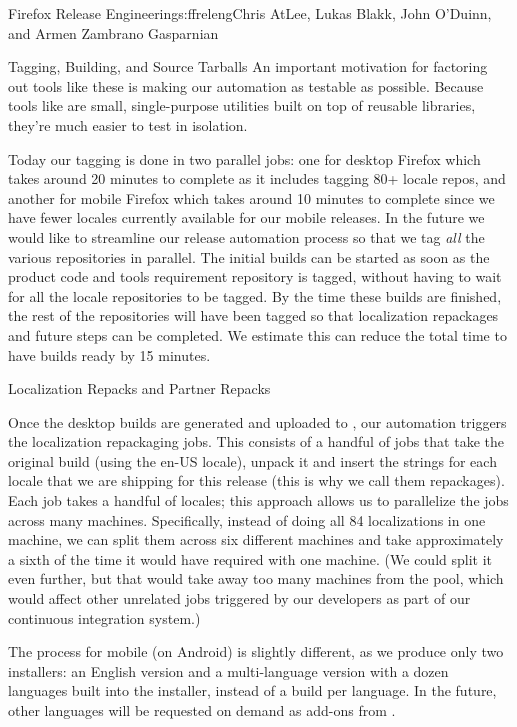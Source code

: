 \begin{aosachapter}{Firefox Release Engineering}{s:ffreleng}{Chris AtLee, Lukas Blakk, John O'Duinn, and Armen Zambrano Gasparnian}
\begin{aosasect1}{Tagging, Building, and Source Tarballs}
An important motivation for factoring out tools like these is 
making our automation as testable as possible. Because tools like
 are small, single-purpose utilities built on top of
reusable libraries, they're much easier to test in isolation.

Today our tagging is done in two parallel jobs: one for desktop
Firefox which takes around 20 minutes to complete as it includes
tagging 80+ locale repos, and another for mobile Firefox which takes
around 10 minutes to complete since we have fewer locales currently
available for our mobile releases. In the future we would like to
streamline our release automation process so that we tag \emph{all}
the various repositories in parallel. The initial builds can be
started as soon as the product code and tools requirement
repository is tagged, without having to wait for all the locale
repositories to be tagged. By the time these builds are finished, the
rest of the repositories will have been tagged so that localization
repackages and future steps can be completed.  We estimate this can
reduce the total time to have builds ready by 15 minutes.

\end{aosasect1}

\begin{aosasect1}{Localization Repacks and Partner Repacks}


Once the desktop builds are generated and uploaded to
, our automation triggers the localization
repackaging jobs. This consists of a handful of jobs that take the
original build (using the en-US locale), unpack it and insert
the strings for each locale that we are shipping for this release
(this is why we call them repackages). Each job takes a handful of
locales; this approach allows us to parallelize the jobs across many
machines. Specifically, instead of doing all 84 localizations in
one machine, we can split them across six different machines and take
approximately a sixth of the time it would have required with
one machine. (We could split it even further, but that would take away too
many machines from the pool, which would affect other unrelated jobs
triggered by our developers as part of our continuous integration
system.)
    
The process for mobile (on Android) is slightly different, as we produce
only two installers: an English version and a multi-language version
with a dozen languages built into the installer, instead of a
build per language. In the future, other languages will be requested
on demand as add-ons from .


\end{aosasect1}
\end{aosachapter}

